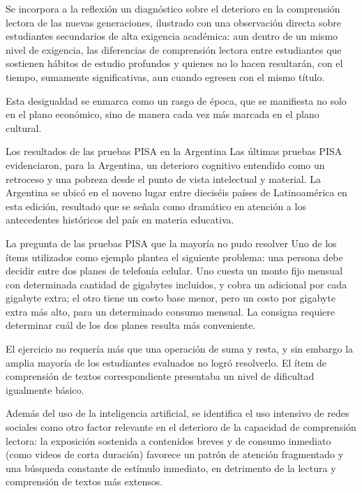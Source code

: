 \documentclass[12pt,oneside]{book}
\begin{document}
Se incorpora a la reflexión un diagnóstico sobre el deterioro en la comprensión lectora de las nuevas generaciones, ilustrado con una observación directa sobre estudiantes secundarios de alta exigencia académica: aun dentro de un mismo nivel de exigencia, las diferencias de comprensión lectora entre estudiantes que sostienen hábitos de estudio profundos y quienes no lo hacen resultarán, con el tiempo, sumamente significativas, aun cuando egresen con el mismo título.

Esta desigualdad se enmarca como un rasgo de época, que se manifiesta no solo en el plano económico, sino de manera cada vez más marcada en el plano cultural.

\begin{example}{Los resultados de las pruebas PISA en la Argentina}
Las últimas pruebas PISA evidenciaron, para la Argentina, un deterioro cognitivo entendido como un retroceso y una pobreza desde el punto de vista intelectual y material. La Argentina se ubicó en el noveno lugar entre dieciséis países de Latinoamérica en esta edición, resultado que se señala como dramático en atención a los antecedentes históricos del país en materia educativa.
\end{example}

\begin{example}{La pregunta de las pruebas PISA que la mayoría no pudo resolver}
Uno de los ítems utilizados como ejemplo plantea el siguiente problema: una persona debe decidir entre dos planes de telefonía celular. Uno cuesta un monto fijo mensual con determinada cantidad de gigabytes incluidos, y cobra un adicional por cada gigabyte extra; el otro tiene un costo base menor, pero un costo por gigabyte extra más alto, para un determinado consumo mensual. La consigna requiere determinar cuál de los dos planes resulta más conveniente.

El ejercicio no requería más que una operación de suma y resta, y sin embargo la amplia mayoría de los estudiantes evaluados no logró resolverlo. El ítem de comprensión de textos correspondiente presentaba un nivel de dificultad igualmente básico.
\end{example}

Además del uso de la inteligencia artificial, se identifica el uso intensivo de redes sociales como otro factor relevante en el deterioro de la capacidad de comprensión lectora: la exposición sostenida a contenidos breves y de consumo inmediato (como videos de corta duración) favorece un patrón de atención fragmentado y una búsqueda constante de estímulo inmediato, en detrimento de la lectura y comprensión de textos más extensos.
\end{document}
